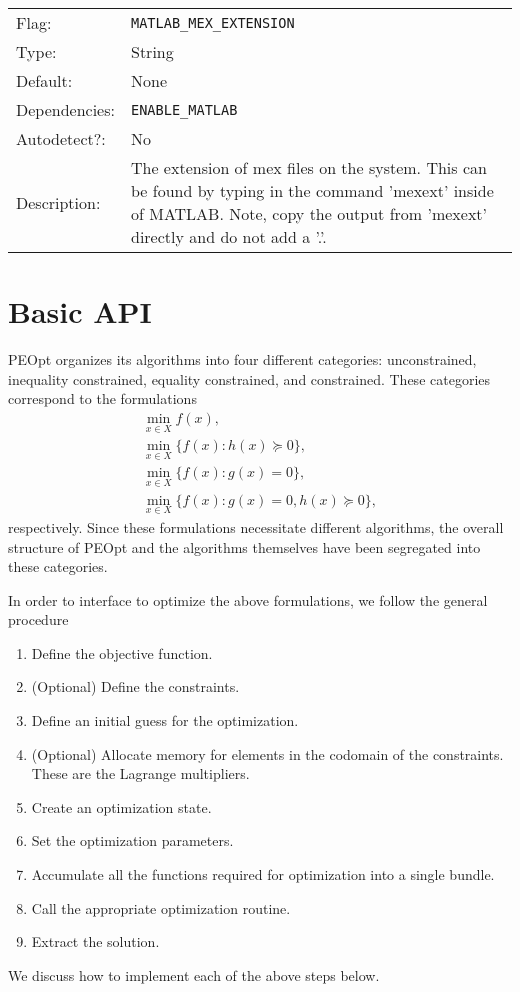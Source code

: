 \documentclass{report}
\begin{document}
\begin{center}
\begin{longtable}{lp{}}
\\
Flag:         &\texttt{MATLAB\_MEX\_EXTENSION}\\
Type:         &String \\
Default:      &None \\
Dependencies: &\texttt{ENABLE\_MATLAB}\\
Autodetect?:  &No \\
Description:  &The extension of mex files on the system.  This can be found
              by typing in the command 'mexext' inside of MATLAB.  Note, copy
              the output from 'mexext' directly and do not add a '.'.
\end{longtable}
\end{center}
       
\chapter{Basic API}\label{ch:Basic}

       PEOpt organizes its algorithms into four different categories: unconstrained, inequality constrained, equality constrained, and constrained.  These categories correspond to the formulations
$$\begin{array}{l}
    \min\limits_{x\in X} f(x),\\
    \min\limits_{x\in X} \{ f(x) : h(x)\succeq 0\},\\
    \min\limits_{x\in X} \{ f(x) : g(x)=0 \},\\
    \min\limits_{x\in X} \{ f(x) : g(x)=0, h(x)\succeq 0 \},
\end{array}$$
respectively.  Since these formulations necessitate different algorithms, the overall structure of PEOpt and the algorithms themselves have been segregated into these categories.

        In order to interface to optimize the above formulations, we follow the general procedure
\begin{enumerate}
    \item Define the objective function.
    \item (Optional) Define the constraints.
    \item Define an initial guess for the optimization.
    \item (Optional) Allocate memory for elements in the codomain of the constraints.  These are the Lagrange multipliers. 
    \item Create an optimization state.
    \item Set the optimization parameters.
    \item Accumulate all the functions required for optimization into a single bundle.
    \item Call the appropriate optimization routine.
    \item Extract the solution.
\end{enumerate}
We discuss how to implement each of the above steps below. 
\end{document}
